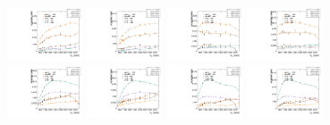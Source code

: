 \begin{figure}[htbp]
  \includegraphics[width=0.2\textwidth]{fig/2Dfit/paramSignalYield_NonVBFSig_mu_HP_vbf_LDy.pdf}
  \includegraphics[width=0.2\textwidth]{fig/2Dfit/paramSignalYield_NonVBFSig_e_HP_vbf_LDy.pdf}
  \includegraphics[width=0.2\textwidth]{fig/2Dfit/paramSignalYield_NonVBFSig_mu_LP_vbf_LDy.pdf}
  \includegraphics[width=0.2\textwidth]{fig/2Dfit/paramSignalYield_NonVBFSig_e_LP_vbf_LDy.pdf}\\
  \includegraphics[width=0.2\textwidth]{fig/2Dfit/paramSignalYield_NonVBFSig_mu_HP_bb_HDy.pdf}
  \includegraphics[width=0.2\textwidth]{fig/2Dfit/paramSignalYield_NonVBFSig_e_HP_bb_HDy.pdf}
  \includegraphics[width=0.2\textwidth]{fig/2Dfit/paramSignalYield_NonVBFSig_mu_LP_bb_HDy.pdf}
  \includegraphics[width=0.2\textwidth]{fig/2Dfit/paramSignalYield_NonVBFSig_e_LP_bb_HDy.pdf}\\

\end{figure}
